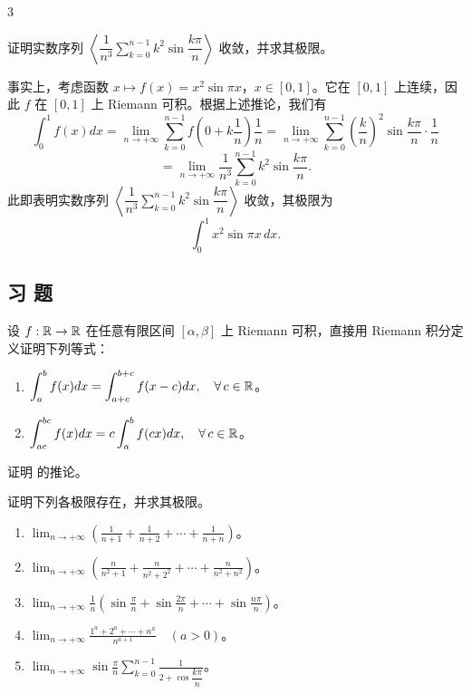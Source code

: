 \begin{sourceexample}{3}

	证明实数序列 \(\left\langle\dfrac1{n^3}\sum_{k=0}^{n-1}k^2\sin\dfrac{k\pi}{n}\right\rangle\) 收敛，并求其极限。

	事实上，考虑函数 \(x\longmapsto f(x)=x^2\sin\pi x\)，\(x\in[0,1]\)。它在 \([0,1]\) 上连续，因此 \(f\) 在 \([0,1]\) 上 Riemann 可积。根据上述推论，我们有
	\[
	\int_0^1 f(x)dx=\lim_{n\to+\infty}\sum_{k=0}^{n-1}f\left(0+k\frac1n\right)\frac1n
	=\lim_{n\to+\infty}\sum_{k=0}^{n-1}\left(\frac kn\right)^2\sin\frac{k\pi}{n}\cdot\frac1n
	\]
	\[
	=\lim_{n\to+\infty}\frac1{n^3}\sum_{k=0}^{n-1}k^2\sin\frac{k\pi}{n}.
	\]
	此即表明实数序列 \(\left\langle\dfrac1{n^3}\sum_{k=0}^{n-1}k^2\sin\dfrac{k\pi}{n}\right\rangle\) 收敛，其极限为
	\[
	\int_0^1 x^2\sin\pi x\,dx.
	\]

\end{sourceexample}

\subsection*{习 题}

\begin{exercise}
	\item 设 \(f:\mathbb{R}\to\mathbb{R}\) 在任意有限区间 \([\alpha,\beta]\) 上 Riemann 可积，直接用 Riemann 积分定义证明下列等式：
	\begin{enumerate}[label=\arabic*)]
		\item \(\displaystyle\int_a^b f(x)dx=\int_{a+c}^{b+c}f(x-c)dx,\quad\forall\,c\in\mathbb{R}\)。
		\item \(\displaystyle\int_{ac}^{bc}f(x)dx=c\int_a^b f(cx)dx,\quad\forall\,c\in\mathbb{R}\)。
	\end{enumerate}
\end{exercise}

\begin{exercise}
	\item 证明 的推论。
\end{exercise}

\begin{exercise}
	\item 证明下列各极限存在，并求其极限。
	\begin{enumerate}[label=\arabic*)]
		\item \(\displaystyle\lim_{n\to+\infty}\left(\frac1{n+1}+\frac1{n+2}+\cdots+\frac1{n+n}\right)\)。
		\item \(\displaystyle\lim_{n\to+\infty}\left(\frac{n}{n^2+1}+\frac{n}{n^2+2^2}+\cdots+\frac{n}{n^2+n^2}\right)\)。
		\item \(\displaystyle\lim_{n\to+\infty}\frac1n\left(\sin\frac\pi n+\sin\frac{2\pi}{n}+\cdots+\sin\frac{n\pi}{n}\right)\)。
		\item \(\displaystyle\lim_{n\to+\infty}\frac{1^a+2^a+\cdots+n^a}{n^{a+1}}\quad(a>0)\)。
		\item \(\displaystyle\lim_{n\to+\infty}\sin\frac\pi n\sum_{k=0}^{n-1}\frac1{2+\cos\dfrac{k\pi}{n}}\)。
	\end{enumerate}
\end{exercise}

